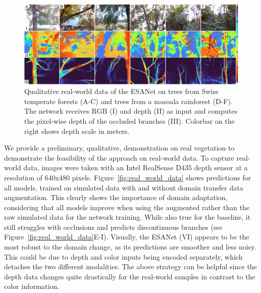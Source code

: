 \begin{figure}[!hpt]
\centering
\includegraphics[scale=1]{figures/fig-5-qualitative-real/fig-5-qualitative-real.pdf}
\caption{Qualitative real-world data of the ESANet on trees from Swiss temperate forests (A-C) and trees from a masoala rainforest (D-F). The network receives RGB (I) and depth (II) as input and computes the pixel-wise depth of the occluded branches (III). Colorbar on the right shows depth scale in meters.}
\label{fig-5-qualitative-real}
\vspace{\figurevspacebelow}
\end{figure}




We provide a preliminary, qualitative, demonstration on real vegetation to demonstrate the feasibility of the approach on real-world data. To capture real-world data, images were taken with an Intel RealSense D435 depth sensor at a resolution of 640x480 pixels. Figure~\ref{fig:real_world_data} shows predictions for all models, trained on simulated data with and without domain transfer data augmentation. This clearly shows the importance of domain adaptation, considering that all models improve when using the augmented rather than the raw simulated data for the network training. While also true for the baseline, it still struggles with occlusions and predicts discontinuous branches (see Figure~\ref{fig:real_world_data}E-I). Visually, the ESANet (VI) appears to be the most robust to the domain change, as its predictions are smoother and less noisy. This could be due to depth and color inputs being encoded separately, which detaches the two different modalities. The above strategy can be helpful since the depth data changes quite drastically for the real-world samples in contrast to the color information. 

